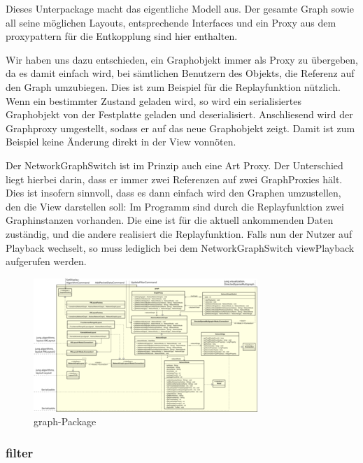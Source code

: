     Dieses Unterpackage macht das eigentliche Modell aus. Der gesamte Graph sowie
    all seine möglichen Layouts, entsprechende Interfaces und ein Proxy aus dem
    \gls{proxypattern} für die Entkopplung sind hier enthalten.\par
    Wir haben uns dazu entschieden, ein Graphobjekt immer als Proxy zu übergeben, da es damit einfach wird,
    bei sämtlichen Benutzern des Objekts, die Referenz auf den Graph umzubiegen. Dies ist zum Beispiel
    für die Replayfunktion nützlich. Wenn ein bestimmter Zustand geladen wird, so wird ein serialisiertes
    Graphobjekt von der Festplatte geladen und deserialisiert. Anschliesend wird der Graphproxy
    umgestellt, sodass er auf das neue Graphobjekt zeigt. Damit ist zum Beispiel keine Änderung direkt in der View vonnöten.\par
    Der NetworkGraphSwitch ist im Prinzip auch eine Art Proxy. Der Unterschied liegt hierbei darin, dass
    er immer zwei Referenzen auf zwei GraphProxies hält. Dies ist insofern sinnvoll, dass es dann einfach wird
    den Graphen umzustellen, den die View darstellen soll: Im Programm sind durch die Replayfunktion zwei
    Graphinstanzen vorhanden. Die eine ist für die aktuell ankommenden Daten zuständig, und die andere realisiert
    die Replayfunktion. Falls nun der Nutzer auf Playback wechselt, so muss lediglich bei dem NetworkGraphSwitch
    viewPlayback aufgerufen werden.

    \clearpage
    \begin{figure}
      \centering
      \includegraphics[width=\textwidth]{../diagramimages/graph.png}
      \caption{graph-Package}
    \end{figure}
    \clearpage

    \subsubsection{filter}
    \label{subsubsec:filter}

